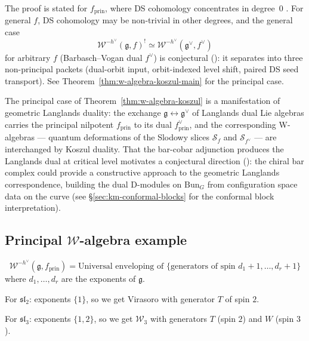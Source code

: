 \begin{remark}
\label{rem:w-koszul-general-nilpotent}
The proof is stated for $f_{\mathrm{prin}}$, where DS cohomology concentrates in degree~$0$ \cite{FF}.  For general $f$, DS cohomology may be non-trivial in other degrees, and the general case
\[
\mathcal{W}^{-h^\vee}(\mathfrak{g}, f)^! \simeq \mathcal{W}^{-h^\vee}(\mathfrak{g}^\vee, f^\vee)
\]
for arbitrary $f$ (Barbasch--Vogan dual $f^\vee$) is conjectural (\ClaimStatusConjectured): it separates into three non-principal packets (dual-orbit input, orbit-indexed level shift, paired DS seed transport).  See Theorem~\ref{thm:w-algebra-koszul-main} for the principal case.
\end{remark}

\begin{remark}
The principal case of Theorem~\ref{thm:w-algebra-koszul} is a manifestation of geometric Langlands duality: the exchange $\mathfrak{g} \leftrightarrow \mathfrak{g}^\vee$ of Langlands dual Lie algebras carries the principal nilpotent $f_{\mathrm{prin}}$ to its dual $f^\vee_{\mathrm{prin}}$, and the corresponding W-algebras --- quantum deformations of the Slodowy slices $\mathcal{S}_f$ and $\mathcal{S}_{f^\vee}$ --- are interchanged by Koszul duality.  That the bar-cobar adjunction produces the Langlands dual at critical level motivates a conjectural direction (\ClaimStatusConjectured): the chiral bar complex could provide a constructive approach to the geometric Langlands correspondence, building the dual D-modules on $\mathrm{Bun}_G$ from configuration space data on the curve (see \S\ref{sec:km-conformal-blocks} for the conformal block interpretation).
\end{remark}

\subsection{Principal $\mathcal{W}$-algebra example}

\begin{theorem}
\label{thm:principal-w-algebra-structure}
\begin{equation}
\mathcal{W}^{-h^\vee}(\mathfrak{g}, f_{\mathrm{prin}}) = \text{Universal enveloping of } \{\text{generators of spin } d_1+1, \ldots, d_r+1\}
\end{equation}
where $d_1, \ldots, d_r$ are the exponents of $\mathfrak{g}$.

For $\mathfrak{sl}_2$: exponents $\{1\}$, so we get Virasoro with generator $T$ of spin $2$.

For $\mathfrak{sl}_3$: exponents $\{1,2\}$, so we get $\mathcal{W}_3$ with generators $T$ (spin $2$) and $W$ (spin $3$).
\end{theorem}

